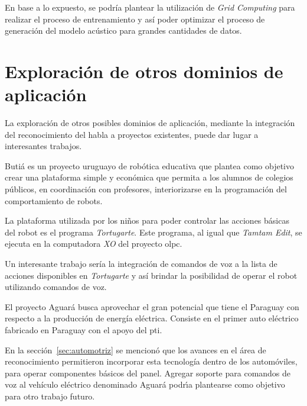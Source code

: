 En base a lo expuesto, se podr\'ia plantear la utilizaci\'on de \emph{Grid Computing} para realizar el 
proceso de entrenamiento y as\'i poder optimizar el proceso de generaci\'on del modelo ac\'ustico 
para grandes cantidades de datos.

\section{Exploraci\'on de otros dominios de aplicaci\'on}
La exploraci\'on de otros posibles dominios de aplicaci\'on, mediante la integraci\'on del reconocimiento 
del habla a proyectos existentes, puede dar lugar a interesantes trabajos.

Buti\'a es un proyecto uruguayo de rob\'otica educativa \cite{RoboticaEducativa} que plantea como objetivo 
crear una plataforma simple y econ\'omica que permita a los alumnos de colegios p\'ublicos,
en coordinaci\'on con profesores, interiorizarse en la programaci\'on del comportamiento de 
robots\cite{Butia}.

La plataforma utilizada por los ni\~nos para poder controlar las acciones b\'asicas del robot es el 
programa \emph{Tortugarte}. Este programa, al igual que \emph{Tamtam Edit}, se ejecuta en la computadora 
\emph{XO} del proyecto \gls{olpc}.

Un interesante trabajo ser\'ia la integraci\'on de comandos de voz a la lista de acciones disponibles 
en \emph{Tortugarte} y as\'i brindar la posibilidad de operar el robot utilizando comandos de voz.

El proyecto Aguar\'a busca aprovechar el gran potencial que tiene el Paraguay con respecto a la 
producci\'on de energ\'ia el\'ectrica. Consiste en el primer auto el\'ectrico fabricado en Paraguay 
con el apoyo del \gls{pti}. 

En la secci\'on~\ref{sec:automotriz} se mencion\'o que los avances en el \'area de reconocimiento
permitieron incorporar esta tecnolog\'ia dentro de los autom\'oviles, para operar componentes b\'asicos 
del panel.
Agregar soporte para comandos de voz al veh\'iculo el\'ectrico denominado Aguar\'a podr{\'\i}a plantearse 
como objetivo para otro trabajo futuro.
